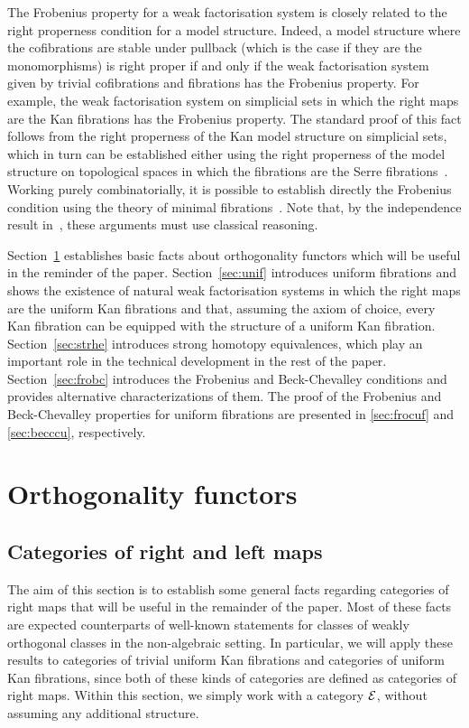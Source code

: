 \documentclass[reqno,10pt,a4paper,oneside,draft]{amsart}
\begin{document}
The Frobenius property for a weak factorisation system is closely related to the right properness condition for a model structure.
Indeed, a model structure where the cofibrations are stable under pullback (which is the case if they are the monomorphisms) is right proper if and only if the weak factorisation system given by trivial cofibrations and fibrations has the Frobenius property.
For example, the weak factorisation system on simplicial sets in which the right maps are the Kan fibrations has the Frobenius property.
The standard proof of this fact follows from the right properness of the Kan model structure on simplicial sets, which in turn can be established either using the right properness of the model structure on topological spaces in which the fibrations are the Serre fibrations~\cite[Theorem~13.1.13]{hirschhorn-model-localizations}.
Working purely combinatorially, it is possible to establish directly the Frobenius condition using the theory of minimal fibrations~\cite[Theorem~1.7.1]{joyal-tierney-notes}.
Note that, by the independence result in~\cite{coquand-non-constructivity-kan}, these arguments must use classical reasoning.


Section~\ref{sec:ortf} establishes basic facts about orthogonality functors which will be useful in the reminder of the paper.
Section~\ref{sec:unif} introduces uniform fibrations and shows the existence of natural weak factorisation systems in which the right maps are the uniform Kan fibrations and that, assuming the axiom of choice, every Kan fibration can be equipped with the structure of a uniform Kan fibration.
Section~\ref{sec:strhe} introduces strong homotopy equivalences, which play an important role in the technical development in the rest of the paper.
Section~\ref{sec:frobc} introduces the Frobenius and Beck-Chevalley conditions and provides alternative characterizations of them.
The proof of the Frobenius and Beck-Chevalley properties for uniform fibrations are presented in \cref{sec:frocuf} and \cref{sec:becccu}, respectively.




\section{Orthogonality functors}
\label{sec:ortf}

\subsection*{Categories of right and left maps}
The aim of this section is to establish some general facts regarding categories of right maps that will be useful in the remainder of the paper.
Most of these facts are expected counterparts of well-known statements for classes of weakly orthogonal classes in the non-algebraic setting.
In particular, we will apply these results to categories of trivial uniform Kan fibrations and categories of uniform Kan fibrations, since both of these kinds of categories are defined as categories of right maps.
Within this section, we simply work with a category $\mathcal{E}$, without assuming any additional structure.
\end{document}
